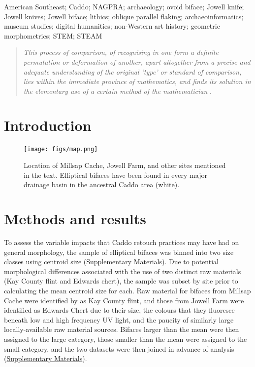 \documentclass[]{interact}
\theoremstyle{plain}%
\theoremstyle{definition}
\theoremstyle{remark}
\begin{document}
\begin{keywords}
American Southeast; Caddo; NAGPRA; archaeology; ovoid biface; Jowell
knife; Jowell knives; Jowell biface; lithics; oblique parallel flaking;
archaeoinformatics; museum studies; digital humanities; non-Western art
history; geometric morphometrics; STEM; STEAM
\end{keywords}

\begin{quote}
\textit{This process of comparison, of recognising in one form a definite permutation or deformation of another, apart altogether from a precise and adequate understanding of the original 'type' or standard of comparison, lies within the immediate province of mathematics, and finds its solution in the elementary use of a certain method of the mathematician} \citep{RN7522}.
\end{quote}

\hypertarget{introduction}{%
\section{Introduction}\label{introduction}}

\begin{figure}\centering
\texttt{[image: figs/map.png]}
\caption{Location of Millsap Cache, Jowell Farm, and other sites mentioned in the text. Elliptical bifaces have been found in every major drainage basin in the ancestral Caddo area (white).}
\label{fig:map}
\end{figure}

\hypertarget{methods-and-results}{%
\section{Methods and results}\label{methods-and-results}}

To assess the variable impacts that Caddo retouch practices may have had
on general morphology, the sample of elliptical bifaces was binned into
two size classes using centroid size
(\href{https://seldenlab.github.io/elliptical.bifaces/}{Supplementary
Materials}). Due to potential morphological differences associated with
the use of two distinct raw materials (Kay County flint and Edwards
chert), the sample was subset by site prior to calculating the mean
centroid size for each. Raw material for bifaces from Millsap Cache were
identified by \citet{RN11461} as Kay County flint, and those from Jowell
Farm were identified as Edwards Chert due to their size, the colours
that they fluoresce beneath low and high frequency UV light, and the
paucity of similarly large locally-available raw material sources.
Bifaces larger than the mean were then assigned to the large category,
those smaller than the mean were assigned to the small category, and the
two datasets were then joined in advance of analysis
(\href{https://seldenlab.github.io/elliptical.bifaces/}{Supplementary
Materials}).
\end{document}
